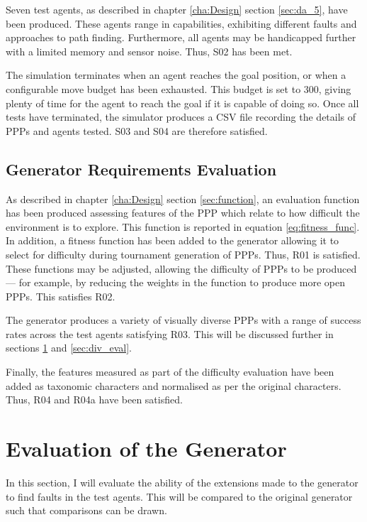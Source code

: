 \documentclass[authoryearcitations]{UoYCSproject}
\begin{document}
Seven test agents, as described in chapter \ref{cha:Design} section \ref{sec:da_5}, have been produced. These agents range in capabilities, exhibiting different faults and approaches to path finding. Furthermore, all agents may be handicapped further with a limited memory and sensor noise. Thus, S02 has been met.

The simulation terminates when an agent reaches the goal position, or when a configurable move budget has been exhausted. This budget is set to 300, giving plenty of time for the agent to reach the goal if it is capable of doing so. Once all tests have terminated, the simulator produces a CSV file recording the details of PPPs and agents tested. S03 and S04 are therefore satisfied.

\subsection{Generator Requirements Evaluation}
\label{sec:gen_req_eval}
As described in chapter \ref{cha:Design} section \ref{sec:function}, an evaluation function has been produced assessing features of the PPP which relate to how difficult the environment is to explore. This function is reported in equation \ref{eq:fitness_func}. In addition, a fitness function has been added to the generator allowing it to select for difficulty during tournament generation of PPPs. Thus, R01 is satisfied. These functions may be adjusted, allowing the difficulty of PPPs to be produced --- for example, by reducing the weights in the function to produce more open PPPs. This satisfies R02.

The generator produces a variety of visually diverse PPPs with a range of success rates across the test agents satisfying R03. This will be discussed further in sections \ref{sec:gen_eval} and \ref{sec:div_eval}.

Finally, the features measured as part of the difficulty evaluation have been added as taxonomic characters and normalised as per the original characters. Thus, R04 and R04a have been satisfied.

\section{Evaluation of the Generator}
\label{sec:gen_eval}

In this section, I will evaluate the ability of the extensions made to the generator to find faults in the test agents. This will be compared to the original generator such that comparisons can be drawn.
\end{document}
